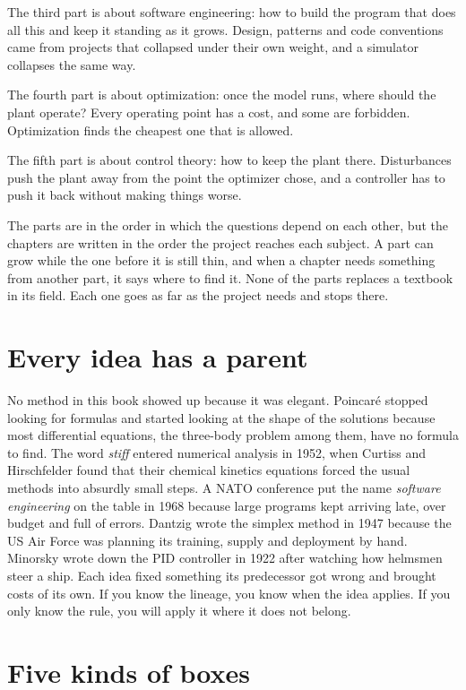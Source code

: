 The third part is about software engineering: how to build the program that does
all this and keep it standing as it grows. Design, patterns and code conventions
came from projects that collapsed under their own weight, and a simulator
collapses the same way.

The fourth part is about optimization: once the model runs, where should the
plant operate? Every operating point has a cost, and some are forbidden.
Optimization finds the cheapest one that is allowed.

The fifth part is about control theory: how to keep the plant there.
Disturbances push the plant away from the point the optimizer chose, and a
controller has to push it back without making things worse.

The parts are in the order in which the questions depend on each other, but the
chapters are written in the order the project reaches each subject. A part can
grow while the one before it is still thin, and when a chapter needs something
from another part, it says where to find it. None of the parts replaces a
textbook in its field. Each one goes as far as the project needs and stops
there.

\section*{Every idea has a parent}

No method in this book showed up because it was elegant. Poincaré stopped
looking for formulas and started looking at the shape of the solutions because
most differential equations, the three-body problem among them, have no formula
to find. The word \emph{stiff} entered numerical analysis in 1952, when Curtiss
and Hirschfelder found that their chemical kinetics equations forced the usual
methods into absurdly small steps. A NATO conference put the name
\emph{software engineering} on the table in 1968 because large programs kept
arriving late, over budget and full of errors. Dantzig wrote the simplex method
in 1947 because the US Air Force was planning its training, supply and
deployment by hand. Minorsky wrote down the PID controller in 1922 after
watching how helmsmen steer a ship. Each idea fixed something its predecessor
got wrong and brought costs of its own. If you know the lineage, you know when
the idea applies. If you only know the rule, you will apply it where it does not
belong.

\section*{Five kinds of boxes}

